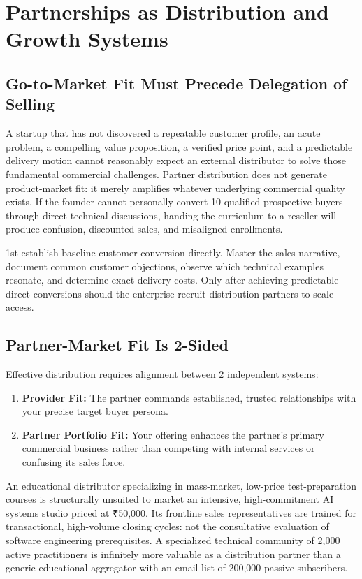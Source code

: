 \section{Partnerships as Distribution and Growth Systems}
\label{sec:ch30_partnerships_distribution_growth}

\subsection{Go-to-Market Fit Must Precede Delegation of Selling}
\label{sec:gtm_fit_precedes_delegation}

A startup that has not discovered a repeatable customer profile, an acute problem, a compelling value proposition, a verified price point, and a predictable delivery motion cannot reasonably expect an external distributor to solve those fundamental commercial challenges. Partner distribution does not generate product-market fit: it merely amplifies whatever underlying commercial quality exists. If the founder cannot personally convert 10 qualified prospective buyers through direct technical discussions, handing the curriculum to a reseller will produce confusion, discounted sales, and misaligned enrollments.

1st establish baseline customer conversion directly. Master the sales narrative, document common customer objections, observe which technical examples resonate, and determine exact delivery costs. Only after achieving predictable direct conversions should the enterprise recruit distribution partners to scale access.

\subsection{Partner-Market Fit Is 2-Sided}
\label{sec:partner_market_fit_two_sided}

Effective distribution requires alignment between 2 independent systems:
\begin{enumerate}
\item \textbf{Provider Fit:} The partner commands established, trusted relationships with your precise target buyer persona.
\item \textbf{Partner Portfolio Fit:} Your offering enhances the partner's primary commercial business rather than competing with internal services or confusing its sales force.
\end{enumerate}

An educational distributor specializing in mass-market, low-price test-preparation courses is structurally unsuited to market an intensive, high-commitment AI systems studio priced at ₹50,000. Its frontline sales representatives are trained for transactional, high-volume closing cycles: not the consultative evaluation of software engineering prerequisites. A specialized technical community of 2,000 active practitioners is infinitely more valuable as a distribution partner than a generic educational aggregator with an email list of 200,000 passive subscribers.


